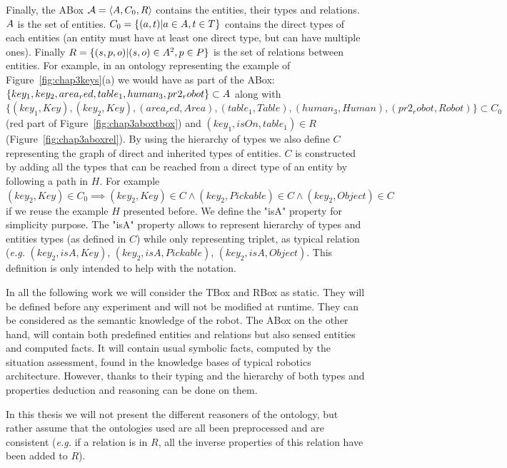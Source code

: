 \documentclass[a4paper,11pt,twoside]{StyleThese}
\begin{document}
Finally, the ABox $\mathcal{A} = \langle A, C_0, R \rangle$ contains the entities, their types and relations. $A$ is the set of entities. $C_0 = \{(a, t)|a \in A, t \in T\}$ contains the direct types of each entities (an entity must have at least one direct type, but can have multiple ones). Finally $R = \{(s, p, o)|(s, o) \in A^2, p \in P\}$ is the set of relations between entities. For example, in an ontology representing the example of Figure~\ref{fig:chap3keys}(a) we would have as part of the ABox: $\{key_1, key_2, area_red, table_1, human_3, pr2_robot\} \subset A$ along with $\{(key_1, Key), (key_2, Key), (area_red, Area), (table_1, Table), (human_3, Human), (pr2_robot, Robot)\} \subset C_0$ (red part of Figure~\ref{fig:chap3aboxtbox}) and $(key_1, isOn, table_1) \in R$ (Figure~\ref{fig:chap3aboxrel}).
By using the hierarchy of types we also define $C$ representing the graph of direct and inherited types of entities. $C$ is constructed by adding all the types that can be reached from a direct type of an entity by following a path in $H$. For example $(key_2, Key) \in C_0 \implies (key_2, Key) \in C \land (key_2, Pickable) \in C \land (key_2, Object) \in C$ if we reuse the example $H$ presented before.
We define the "isA" property for simplicity purpose. The "isA" property allows to represent hierarchy of types and entities types (as defined in $C$) while only representing triplet, as typical relation (\textit{e.g.} $(key_2, isA, Key)$, $(key_2, isA, Pickable)$, $(key_2, isA, Object)$. This definition is only intended to help with the notation.

In all the following work we will consider the TBox and RBox as static. They will be defined before any experiment and will not be modified at runtime. They can be considered as the semantic knowledge of the robot. The ABox on the other hand, will contain both predefined entities and relations but also sensed entities and computed facts. It will contain usual symbolic facts, computed by the situation assessment, found in the knowledge bases of typical robotics architecture. However, thanks to their typing and the hierarchy of both types and properties deduction and reasoning can be done on them.

In this thesis we will not present the different reasoners of the ontology, but rather assume that the ontologies used are all been preprocessed and are consistent (\textit{e.g.} if a relation is in $R$, all the inverse properties of this relation have been added to $R$).
\end{document}
